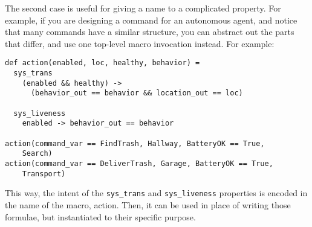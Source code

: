 The second case is useful for giving a name to a complicated property. 
For example, if you are designing a command for an autonomous agent, 
and notice that many commands have a similar structure, you can abstract 
out the parts that differ, and use one top-level macro invocation instead. For example:

\begin{lstlisting}
def action(enabled, loc, healthy, behavior) =
  sys_trans
    (enabled && healthy) ->
      (behavior_out == behavior && location_out == loc)

  sys_liveness
    enabled -> behavior_out == behavior

action(command_var == FindTrash, Hallway, BatteryOK == True,
    Search)
action(command_var == DeliverTrash, Garage, BatteryOK == True,
    Transport)
\end{lstlisting}
This way, the intent of the \lstinline{sys_trans} and \lstinline{sys_liveness} properties is 
encoded in the name of the macro, action. Then, it can be used in place 
of writing those formulae, but instantiated to their specific purpose.

